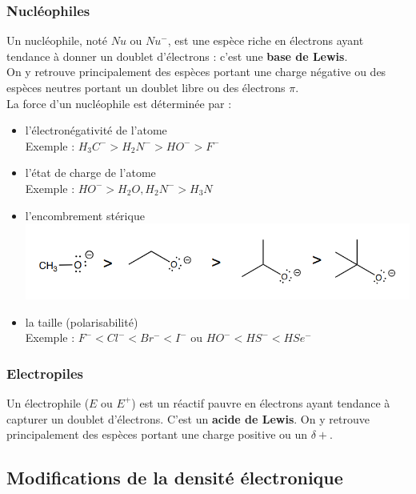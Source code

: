 \documentclass{article}
\begin{document}
        \subsubsection{Nucléophiles}
            Un nucléophile, noté $Nu$ ou $Nu^-$, est une espèce riche en électrons ayant tendance à donner un doublet d'électrons : c'est une \textbf{base de Lewis}.\\
            On y retrouve principalement des espèces portant une charge négative ou des espèces neutres portant un doublet libre ou des électrons $\pi$.\\
            La force d'un nucléophile est déterminée par :
            \begin{itemize}
                \item l'électronégativité de l'atome\\
                Exemple : $H_3C^- > H_2N^- > HO^- > F^-$
                \item l'état de charge de l'atome\\
                Exemple : $HO^- > H_2O, H_2N^- > H_3N$
                \item l'encombrement stérique\\
                \includegraphics[scale=.5]{encombrement_sterique.png}
                \item la taille (polarisabilité)\\
                Exemple : $F^- < Cl^- < Br^- < I^-$ ou $HO^- < HS^- < HSe^-$
            \end{itemize}
        \subsubsection{Electropiles}
            Un électrophile ($E$ ou $E^+$) est un réactif pauvre en électrons ayant tendance à capturer un doublet d'électrons. C'est un \textbf{acide de Lewis}.
            On y retrouve principalement des espèces portant une charge positive ou un $\delta +$.
    \subsection{Modifications de la densité électronique}
\end{document}

